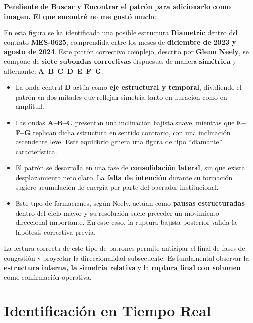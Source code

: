 \textbf{Pendiente de Buscar y Encontrar el patrón para adicionarlo como imagen. El que encontré no me gustó mucho}

\vspace{1em}

\noindent
En esta figura se ha identificado una posible estructura \textbf{Diametric} dentro del contrato \textbf{MES-0625}, comprendida entre los meses de \textbf{diciembre de 2023 y agosto de 2024}. Este patr\'on correctivo complejo, descrito por \textbf{Glenn Neely}, se compone de \textbf{siete subondas correctivas} dispuestas de manera \textbf{sim\'etrica} y alternante: \textbf{A--B--C--D--E--F--G}.

\begin{itemize}
    \item La onda central \textbf{D} act\'ua como \textbf{eje estructural y temporal}, dividiendo el patr\'on en dos mitades que reflejan simetr\'ia tanto en duraci\'on como en amplitud.
    \item Las ondas \textbf{A--B--C} presentan una inclinaci\'on bajista suave, mientras que \textbf{E--F--G} replican dicha estructura en sentido contrario, con una inclinaci\'on ascendente leve. Este equilibrio genera una figura de tipo ``diamante'' caracter\'istica.
    \item El patr\'on se desarrolla en una fase de \textbf{consolidaci\'on lateral}, sin que exista desplazamiento neto claro. La \textbf{falta de intenci\'on} durante su formaci\'on sugiere acumulaci\'on de energ\'ia por parte del operador institucional.
    \item Este tipo de formaciones, seg\'un Neely, act\'uan como \textbf{pausas estructuradas} dentro del ciclo mayor y su resoluci\'on suele preceder un movimiento direccional importante. En este caso, la ruptura bajista posterior valida la hip\'otesis correctiva previa.
\end{itemize}

\noindent
La lectura correcta de este tipo de patrones permite anticipar el final de fases de congesti\'on y proyectar la direccionalidad subsecuente. Es fundamental observar la \textbf{estructura interna, la simetr\'ia relativa} y la \textbf{ruptura final con volumen} como confirmaci\'on operativa.



\section{Identificaci\'on en Tiempo Real}

